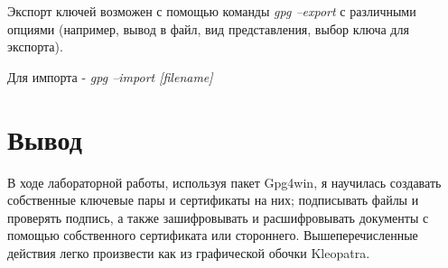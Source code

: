 \documentclass[10pt,a4paper]{report}
\begin{document}
	Экспорт ключей возможен с помощью команды \textit{gpg --export}	с различными опциями (например, вывод в файл, вид представления, выбор ключа для экспорта).
	
	Для импорта - \textit{gpg --import [filename]}
		 	
 	\section{Вывод}
 	В ходе лабораторной работы, используя пакет Gpg4win, я научилась создавать собственные ключевые пары и сертификаты на них; подписывать файлы и проверять подпись, а также зашифровывать и расшифровывать документы с помощью собственного сертификата или стороннего. Вышеперечисленные действия легко произвести как из графической обочки Kleopatra.
	
\end{document}

